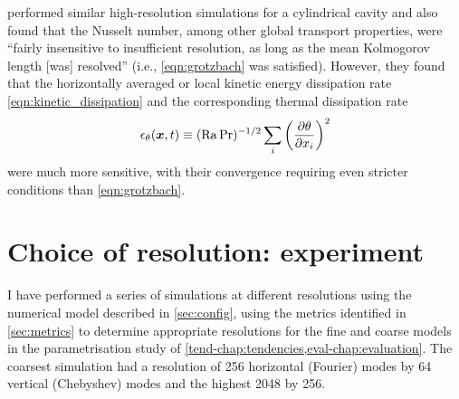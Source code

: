 \documentclass[../main.tex]{subfiles}
\begin{document}
\textcite{scheel2013} performed similar high-resolution simulations for a
cylindrical cavity and also found that the Nusselt number, among other global
transport properties, were ``fairly insensitive to insufficient resolution, as
long as the mean Kolmogorov length [was] resolved'' (i.e., \cref{eqn:grotzbach}
was satisfied). However, they found that the horizontally averaged or local
kinetic energy dissipation rate \cref{eqn:kinetic_dissipation} and the
corresponding thermal dissipation rate
\begin{equation}
    \label{eqn:thermal_dissipation}
    \epsilon_\theta(\bm{x}, t) \equiv
        (\mathrm{Ra}\,\mathrm{Pr})^{-1/2} \sum_i \left(\frac{\partial \theta}{\partial x_i}\right)^2
\end{equation}
were much more sensitive, with their convergence requiring even stricter
conditions than \cref{eqn:grotzbach}.


\section{Choice of resolution: experiment} \label{sec:choose_resolution}
I have performed a series of simulations at different resolutions using the
numerical model described in \cref{sec:config}, using the metrics identified in
\cref{sec:metrics} to determine appropriate resolutions for the fine and coarse
models in the parametrisation study of
\cref{tend-chap:tendencies,eval-chap:evaluation}. The coarsest simulation had a
resolution of 256 horizontal (Fourier) modes by 64 vertical (Chebyshev) modes
and the highest 2048 by 256.
\end{document}
